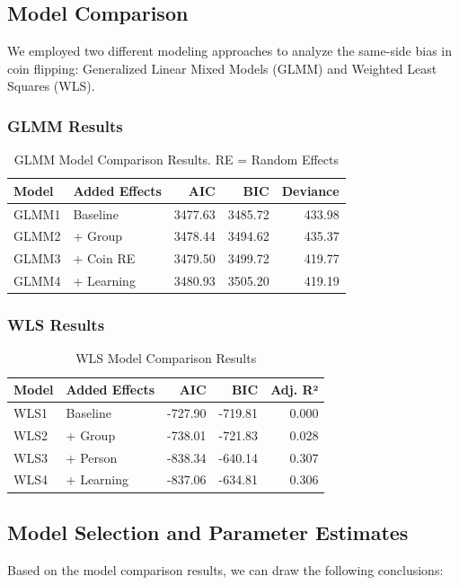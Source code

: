 \documentclass[12pt,a4paper]{article}
\begin{document}
\subsection{Model Comparison}
We employed two different modeling approaches to analyze the same-side bias in coin flipping: Generalized Linear Mixed Models (GLMM) and Weighted Least Squares (WLS).

\subsubsection{GLMM Results}
\begin{table}[H]
\centering
\begin{tabular}{llrrr}
\toprule
\textbf{Model} & \textbf{Added Effects} & \textbf{AIC} & \textbf{BIC} & \textbf{Deviance} \\ 
\midrule
GLMM1 & Baseline & 3477.63 & 3485.72 & 433.98 \\
GLMM2 & + Group & 3478.44 & 3494.62 & 435.37 \\
GLMM3 & + Coin RE & 3479.50 & 3499.72 & 419.77 \\
GLMM4 & + Learning & 3480.93 & 3505.20 & 419.19 \\
\bottomrule
\end{tabular}
\caption{GLMM Model Comparison Results. RE = Random Effects}
\label{tab:glmm_comparison}
\end{table}

\subsubsection{WLS Results}
\begin{table}[H]
\centering
\begin{tabular}{llrrr}
\toprule
\textbf{Model} & \textbf{Added Effects} & \textbf{AIC} & \textbf{BIC} & \textbf{Adj. R²} \\ 
\midrule
WLS1 & Baseline & -727.90 & -719.81 & 0.000 \\
WLS2 & + Group & -738.01 & -721.83 & 0.028 \\
WLS3 & + Person & -838.34 & -640.14 & 0.307 \\
WLS4 & + Learning & -837.06 & -634.81 & 0.306 \\
\bottomrule
\end{tabular}
\caption{WLS Model Comparison Results}
\label{tab:wls_comparison}
\end{table}

\subsection{Model Selection and Parameter Estimates}
Based on the model comparison results, we can draw the following conclusions:
\end{document}
